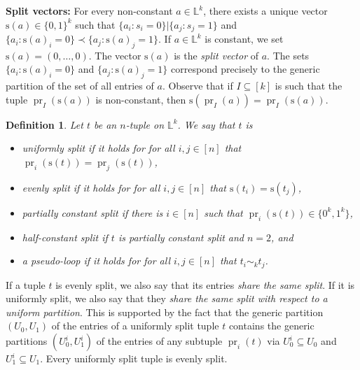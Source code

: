 \documentclass[a4paper,reqno, cleveref]{amsart}
\newtheorem{definition}[theorem]{Definition}
\newcommand{\br}[1]{[#1]}
\newcommand{\s}{\ensuremath{\mathrm{s}}\xspace}
\DeclareMathOperator{\pr}{pr}
\newcommand{\sL}{\mathbb L}
\newcommand{\hyp}{\ensuremath{R}\xspace}
\begin{document}
%




\textbf{Split vectors:}
For every non-constant $a \in \sL^k$, there exists a unique vector $\s(a)\in\{0,1\}^k$ such that $\{a_i\colon s_i=0\}|\{a_j\colon s_j=1\}$ and $\{a_i\colon \s(a)_i=0\}\prec\{a_j\colon \s(a)_j=1\}$. If $a \in \sL^k$ is constant, we set $\s(a)=(0,\ldots,0)$. The vector $\s(a)$ is the \emph{split vector} of $a$. The sets  $\{a_i\colon \s(a)_i=0\}$ and $\{a_j\colon \s(a)_j=1\}$ correspond precisely to the generic partition of the set of all entries of $a$. Observe that if   $I\subseteq[k]$ is such that the tuple $\pr_I(\s(a))$ is non-constant, then $\s(\pr_I(a))= \pr_I(\s(a))$.

\begin{definition}\label{phylo:def:splits}
   Let $t$ be an $n$-tuple on $\sL^k$. We say that $t$ is  %
    \begin{itemize}
        \item \emph{uniformly split} %
        if it holds for for all $i,j\in \br n$  that $\pr_i(\s(t))=\pr_j(\s(t))$,
        \item \emph{evenly split} if it holds for for all $i,j\in \br n$ that $\s(t_i)=\s(t_j)$,
        \item \emph{partially constant split} if there is $i\in \br n$ such that $\pr_i(\s(t))\in\{0^k,1^k\}$,
        \item \emph{half-constant split} if $t$ is partially constant split and $n=2$, and
        \item a \emph{pseudo-loop} if it holds for for all $i,j\in \br n$ that $t_i\sim_kt_j$.
    \end{itemize}
\end{definition}


If a tuple $t$ is evenly split, we also say that its entries \emph{share the same split}. If it is uniformly split, we also say that they \emph{share the same split with respect to a uniform partition}. This is supported by the fact that the generic partition $(U_0,U_1)$ of the entries of a uniformly split tuple $t$ contains the generic partitions $(U^i_{0},U^i_{1})$ of the entries of any subtuple $\pr_i(t)$ via $U^i_{0}\subseteq U_0$ and $U^i_{1}\subseteq U_1$.
%
 Every uniformly split tuple is evenly split.
\end{document}

